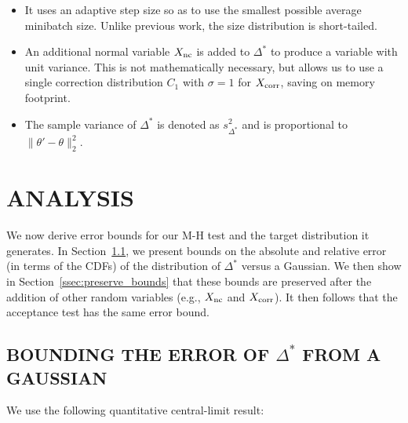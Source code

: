 \documentclass[letterpaper]{article}
\begin{document}
\begin{itemize}[noitemsep]
    \item It uses an adaptive step size so as to use the smallest possible
    average minibatch size. Unlike previous work, the size distribution is
    short-tailed.

    \item An additional normal variable $X_{\rm nc}$ is added to $\Delta^*$ to
    produce a variable with unit variance. This is not mathematically necessary,
    but allows us to use a single correction distribution $C_1$ with $\sigma=1$
    for $X_{\rm corr}$, saving on memory footprint.

    \item The sample variance of $\Delta^*$ is denoted as $s^2_{\Delta^*}$ and
    is proportional to $\|\theta'-\theta\|_2^2$.
    
\end{itemize}





\section{ANALYSIS}\label{sec:analysis}

We now derive error bounds for our M-H test and the target distribution it
generates. 
In Section~\ref{ssec:delta_star_distribution}, we present bounds on the absolute
and relative error (in terms of the CDFs) of the distribution of $\Delta^*$
versus a Gaussian. We then show in Section~\ref{ssec:preserve_bounds} that these
bounds are preserved after the addition of other random variables (e.g., $X_{\rm
nc}$ and $X_{\rm corr}$). It then follows that the acceptance test has the same
error bound.

\subsection{BOUNDING THE ERROR OF $\Delta^*$ FROM A GAUSSIAN}\label{ssec:delta_star_distribution}

We use the following quantitative central-limit result:
  
\end{document}
